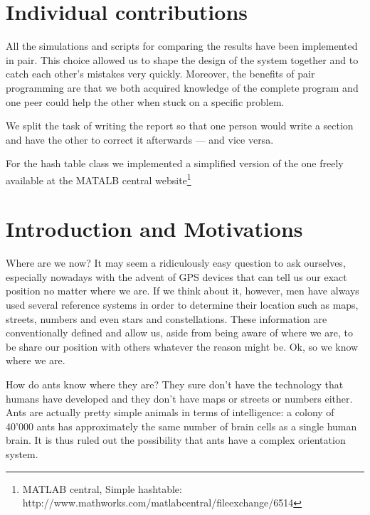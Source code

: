\documentclass[11pt]{article}
\begin{document}
\newpage

\tableofcontents

\newpage


\section{Individual contributions}
All the simulations and scripts for comparing the results have been implemented in pair. This choice allowed us to shape the design of the system together and to catch each other's mistakes very quickly. Moreover, the benefits of pair programming are that we both acquired knowledge of the complete program and one peer could help the other when stuck on a specific problem.

We split the task of writing the report so that one person would write a section and have the other to correct it afterwards --- and vice versa.

For the hash table class we implemented a simplified version of the one freely available at the MATALB central website\footnote{MATLAB central, Simple hashtable: http://www.mathworks.com/matlabcentral/fileexchange/6514}

\section{Introduction and Motivations}

Where are we now? It may seem a ridiculously easy question to ask ourselves, especially nowadays with the advent of GPS devices that can tell us our exact position no matter where we are. If we think about it, however, men have always used several reference systems in order to determine their location such as maps, streets, numbers and even stars and constellations. These information are conventionally defined and allow us, aside from being aware of where we are, to be share our position with others whatever the reason might be. Ok, so we know where we are.

How do ants know where they are? They sure don't have the technology that humans have developed and they don't have maps or streets or numbers either. Ants are actually pretty simple animals in terms of intelligence: a colony of 40'000 ants has approximately the same number of brain cells as a single human brain. It is thus ruled out the possibility that ants have a complex orientation system.
\end{document}

